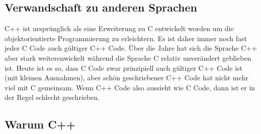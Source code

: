 \documentclass[11pt]{article}
\begin{document}
\subsection{Verwandschaft zu anderen Sprachen}
\label{sec-1-2}
C++ ist ursprünglich als eine Erweiterung zu C entwickelt worden um
die objektorientierte Programmierung zu erleichtern. Es ist daher
immer noch fast jeder C Code auch gültiger C++ Code. Über die Jahre
hat sich die Sprache C++ aber stark weiterenwickelt während die
Sprache C relativ unverändert geblieben ist. Heute ist es so, dass C
Code zwar prinzipiell auch gültiger C++ Code ist (mit kleinen
Ausnahmen), aber schön geschriebener C++ Code hat nicht mehr viel mit
C gemeinsam. Wenn C++ Code also aussieht wie C Code, dann ist er in
der Regel schlecht geschrieben.
\subsection{Warum C++}
\label{sec-1-3}
\end{document}

